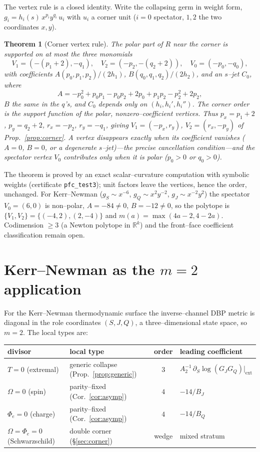 \documentclass[11pt]{article}
\newtheorem{theorem}{Theorem}
\begin{document}
The vertex rule is a closed identity. Write the collapsing germ in weight form,
$g_i=h_i(s)\,x^{p_i}y^{q_i}\,u_i$ with $u_i$ a corner unit ($i=0$ spectator, $1,2$ the two
coordinates $x,y$).

\begin{theorem}[Corner vertex rule]
\label{thm:vertex}
The polar part of $R$ near the corner is supported on at most the three monomials
\[
V_1=(-(p_1+2),-q_1),\quad V_2=(-p_2,-(q_2+2)),\quad V_0=(-p_0,-q_0),
\]
with coefficients $A(p_0,p_1,p_2)/(2h_1)$, $B(q_0,q_1,q_2)/(2h_2)$, and an $s$--jet $C_0$, where
\[
A=-p_0^2+p_0p_1-p_0p_2+2p_0+p_1p_2-p_2^2+2p_2,
\]
$B$ the same in the $q$'s, and $C_0$ depends only on $(h_i,h_i',h_i'')$. The corner order is the
support function of the polar, nonzero--coefficient vertices. Thus $p_x=p_1+2$, $p_y=q_2+2$,
$r_x=-p_2$, $r_y=-q_1$, giving $V_1=(-p_x,r_y)$, $V_2=(r_x,-p_y)$ of Prop.~\ref{prop:corner}. A
vertex disappears exactly when its coefficient vanishes ($A=0$, $B=0$, or a degenerate
$s$--jet)---the precise cancellation condition---and the spectator vertex $V_0$ contributes only
when it is polar ($p_0>0$ or $q_0>0$).
\end{theorem}

The theorem is proved by an exact scalar--curvature computation with symbolic weights
(certificate \texttt{pfc\_test3}); unit factors leave the vertices, hence the order, unchanged.
For Kerr--Newman ($g_S\sim x^{-6}$, $g_Q\sim x^2y^{-2}$, $g_J\sim x^{-2}y^2$) the spectator
$V_0=(6,0)$ is non--polar, $A=-84\ne0$, $B=-12\ne0$, so the polytope is $\{V_1,V_2\}=\{(-4,2),
(2,-4)\}$ and $m(a)=\max(4a-2,4-2a)$. Codimension $\ge3$ (a Newton polytope in $\mathbb R^k$)
and the front--face coefficient classification remain open.

\section{Kerr--Newman as the $m=2$ application}

For the Kerr--Newman thermodynamic surface the inverse--channel DBP metric is diagonal in the
role coordinates $(S,J,Q)$, a three--dimensional state space, so $m=2$. The local types are:

\begin{center}
\begin{tabular}{llcl}
\hline
divisor & local type & order & leading coefficient\\
\hline
$T=0$ (extremal) & generic collapse (Prop.~\ref{prop:generic}) & $3$ &
  $A_2^{-1}\,\partial_S\log(G_JG_Q)|_{\mathrm{ext}}$\\
$\Omega=0$ (spin) & parity--fixed (Cor.~\ref{cor:asymp}) & $4$ & $-14/B_J$\\
$\Phi_e=0$ (charge) & parity--fixed (Cor.~\ref{cor:asymp}) & $4$ & $-14/B_Q$\\
$\Omega=\Phi_e=0$ (Schwarzschild) & double corner (\S\ref{sec:corner}) & wedge & mixed stratum\\
\hline
\end{tabular}
\end{center}
\end{document}
